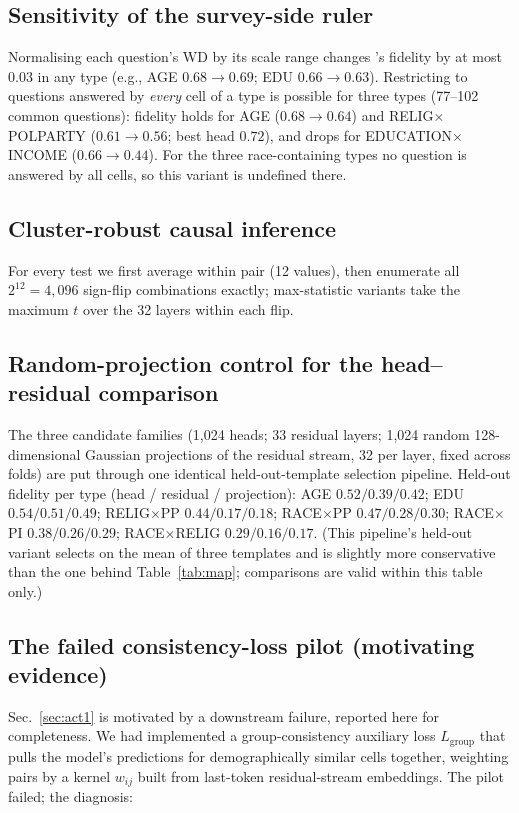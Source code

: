 \subsection{Sensitivity of the survey-side ruler}
\label{app:dreal-sens}
Normalising each question's WD by its scale range changes \starhead's
fidelity by at most $0.03$ in any type (e.g., AGE $0.68\to0.69$; EDU
$0.66\to0.63$). Restricting to questions answered by \emph{every} cell of
a type is possible for three types (77--102 common questions): fidelity
holds for AGE ($0.68\to0.64$) and RELIG$\times$POLPARTY ($0.61\to0.56$;
best head $0.72$), and drops for EDUCATION$\times$INCOME
($0.66\to0.44$). For the three race-containing types no question is
answered by all cells, so this variant is undefined there.

\subsection{Cluster-robust causal inference}
\label{app:cluster}
For every test we first average within pair (12 values), then enumerate
all $2^{12}=4{,}096$ sign-flip combinations exactly; max-statistic
variants take the maximum $t$ over the 32 layers within each flip.

\subsection{Random-projection control for the head--residual comparison}
\label{app:randproj}
The three candidate families (1{,}024 heads; 33 residual layers; 1{,}024
random 128-dimensional Gaussian projections of the residual stream, 32
per layer, fixed across folds) are put through one identical
held-out-template selection pipeline. Held-out fidelity per type
(head / residual / projection): AGE $0.52/0.39/0.42$; EDU
$0.54/0.51/0.49$; RELIG$\times$PP $0.44/0.17/0.18$; RACE$\times$PP
$0.47/0.28/0.30$; RACE$\times$PI $0.38/0.26/0.29$; RACE$\times$RELIG
$0.29/0.16/0.17$. (This pipeline's held-out variant selects on the mean
of three templates and is slightly more conservative than the one behind
Table~\ref{tab:map}; comparisons are valid within this table only.)

\subsection{The failed consistency-loss pilot (motivating evidence)}
\label{app:lgroup}
Sec.~\ref{sec:act1} is motivated by a downstream failure, reported
here for
completeness. We had implemented a group-consistency auxiliary loss
$L_{\text{group}}$ that pulls the model's predictions for demographically
similar cells together, weighting pairs by a kernel $w_{ij}$ built from
last-token residual-stream embeddings. The pilot failed; the diagnosis:

